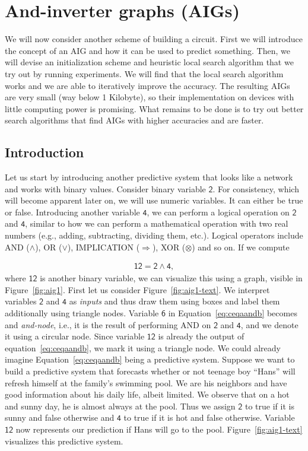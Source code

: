 \section{And-inverter graphs (AIGs)}
We will now consider another scheme of building a circuit. First we will introduce the concept of an AIG and how it can be used to predict something. Then, we will devise an initialization scheme and heuristic local search algorithm that we try out by running experiments. We will find that the local search algorithm works and we are able to iteratively improve the accuracy. The resulting AIGs are very small (way below 1 Kilobyte), so their implementation on devices with little computing power is promising. What remains to be done is to try out better search algorithms that find AIGs with higher accuracies and are faster.

\subsection{Introduction}
Let us start by introducing another predictive system that looks like a network and works with binary values. Consider binary variable $\mathsf{2}$. For consistency, which will become apparent later on, we will use numeric variables. It can either be true or false. Introducing another variable $\mathsf{4}$, we can perform a logical operation on $\mathsf{2}$ and $\mathsf{4}$, similar to how we can perform a mathematical operation with two real numbers (e.g., adding, subtracting, dividing them, etc.). Logical operators include AND ($\wedge$), OR ($\vee$), IMPLICATION ($\Rightarrow$), XOR ($\otimes$) and so on. If we compute

\begin{align} \label{eq:ceqaandb}
    \mathsf{12} = \mathsf{2} \wedge \mathsf{4},
  \end{align}where $\mathsf{12}$ is another binary variable, we can visualize this using a graph, visible in Figure~\ref{fig:aig1}. First let us consider Figure~\ref{fig:aig1-text}. We interpret variables $\mathsf{2}$ and $\mathsf{4}$ as \textit{inputs} and thus draw them using boxes and label them additionally using triangle nodes. Variable $\mathsf{6}$ in Equation~\ref{eq:ceqaandb} becomes and \textit{and-node}, i.e., it is the result of performing AND on $\mathsf{2}$ and $\mathsf{4}$, and we denote it using a circular node. Since variable $\mathsf{12}$ is already the output of equation~\ref{eq:ceqaandb}, we mark it using a triangle node. We could already imagine Equation~\ref{eq:ceqaandb} being a predictive system. Suppose we want to build a predictive system that forecasts whether or not teenage boy \enquote{Hans} will refresh himself at the family's swimming pool. We are his neighbors and have good information about his daily life, albeit limited. We observe that on a hot and sunny day, he is almost always at the pool. Thus we assign $\mathsf{2}$ to true if it is sunny and false otherwise and $\mathsf{4}$ to true if it is hot and false otherwise. Variable $\mathsf{12}$ now represents our prediction if Hans will go to the pool. Figure~\ref{fig:aig1-text} visualizes this predictive system.

